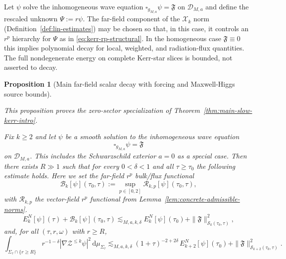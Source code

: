 \documentclass[11pt]{article}
\numberwithin{equation}{section}
\theoremstyle{plain}
\newtheorem{proposition}[theorem]{Proposition}
\theoremstyle{definition}
\theoremstyle{remark}
\newcommand{\dd}{\mathrm{d}}
\begin{document}
Let $\psi$ solve the inhomogeneous wave equation $\square_{g_{M,a}}\psi=\mathfrak{F}$ on $\mathcal D_{M,a}$ and define the rescaled unknown $\Psi:=r\psi$.
The far-field component of the $\mathcal X_{k}$ norm (Definition~\ref{def:lin-estimates}) may be chosen so that, in this case, it controls an $r^{p}$ hierarchy for $\Psi$ as in \eqref{eq:kerr-rp-structural}.
In the homogeneous case $\mathfrak{F}\equiv0$ this implies polynomial decay for local, weighted, and radiation-flux quantities. The full nondegenerate energy on complete Kerr-star slices is bounded, not asserted to decay.

\begin{proposition}[Main far-field scalar decay with forcing and Maxwell-Higgs source bounds]\label{prop:kerr-far-energy-decay}

\noindent\emph{This proposition proves the zero-sector specialization of Theorem~\ref{thm:main-slow-kerr-intro}.}

Fix $k\ge 2$ and let $\psi$ be a smooth solution to the inhomogeneous wave equation
\begin{equation}\label{eq:kerr-inhom-wave}
\square_{g_{M,a}}\psi=\mathfrak{F}
\end{equation}
on $\mathcal D_{M,a}$. This includes the Schwarzschild exterior $a=0$ as a special case.
Then there exists $R\gg1$ such that for every $0<\delta<1$ and all $\tau\ge\tau_{0}$ the following estimate holds.
Here we set the far-field $r^{p}$ bulk/flux functional
\begin{equation}\label{eq:def-Bk-kerr}
\mathcal{B}_{k}[\psi](\tau_{0},\tau)
:=
\sup_{p\in[0,2]}\mathcal R_{k,p}[\psi](\tau_{0},\tau),
\end{equation}
with $\mathcal R_{k,p}$ the vector-field $r^{p}$ functional from Lemma~\ref{lem:concrete-admissible-norms}.
\begin{equation}\label{eq:kerr-energy-decay-scalar}
E^{N}_{k}[\psi](\tau)+\mathcal{B}_{k}[\psi](\tau_{0},\tau)
\lesssim_{M,a,k,\delta}
E^{N}_{k}[\psi](\tau_{0})
+\|\mathfrak{F}\|_{\mathcal S_{k}(\tau_{0},\tau)}^{2},
\end{equation}
and, for all $(\tau,r,\omega)$ with $r\ge R$,
\begin{equation}\label{eq:kerr-far-L2-grad-scalar}
\int_{\Sigma_{\tau}\cap\{r\ge R\}} r^{-1-\delta}|\nabla\mathcal Z^{\le k}\psi|^{2}\,\dd\mu_{\Sigma_{\tau}}
\lesssim_{M,a,k,\delta}
(1+\tau)^{-2+2\delta}\,E^{N}_{k+2}[\psi](\tau_{0})
+\|\mathfrak{F}\|_{\mathcal S_{k+2}(\tau_{0},\tau)}^{2}.
\end{equation}


\end{proposition}
\end{document}
